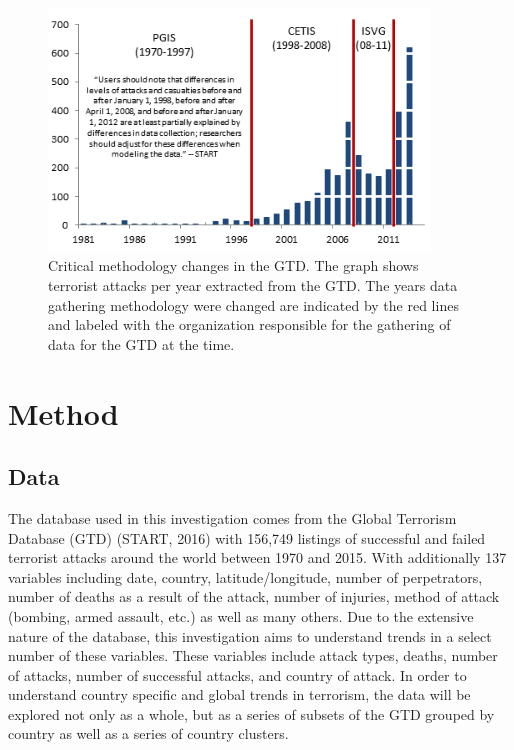 \documentclass[10pt,a4paper]{article}
\begin{document}
\begin{center}
\begin{figure}[h!]
\includegraphics[width=0.9\textwidth]{backgroundpic2.png}
\caption{Critical methodology changes in the GTD. 
The graph shows terrorist attacks per year extracted from the GTD. The years data gathering methodology were changed are indicated by the red lines and labeled with  the organization responsible for the gathering of data for the GTD at the time.
}
\end{figure}
\end{center}

\section{Method}
\subsection{Data}
The database used in this investigation comes from the Global Terrorism Database (GTD) (START, 2016) with 156,749 listings of successful and failed terrorist attacks around the world between 1970 and 2015. With additionally 137 variables including date, country, latitude/longitude, number of perpetrators, number of deaths as a result of the attack, number of injuries, method of attack (bombing, armed assault, etc.) as well as many others. Due to the extensive nature of the database, this investigation aims to understand trends in a select number of these variables. These variables include attack types, deaths, number of attacks, number of successful attacks, and country of attack. In order to understand country specific and global trends in terrorism, the data will be explored not only as a whole, but as a series of subsets of the GTD grouped by country as well as a series of country clusters.
\\\\
\end{document}
